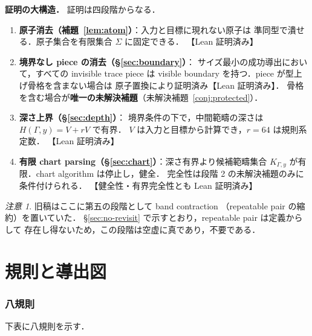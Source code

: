 \documentclass[paper=a4,fontsize=10pt,jafontscale=0.92]{jlreq}
\theoremstyle{plain}
\theoremstyle{definition}
\theoremstyle{remark}
\newtheorem*{remark}{注意}
\newcommand{\Sig}{\Sigma}
\begin{document}
\medskip
\noindent\textbf{証明の大構造．}
証明は四段階からなる．
\begin{enumerate}
  \item \textbf{原子消去（補題~\ref{lem:atom}）}：入力と目標に現れない原子は
    準同型で潰せる．原子集合を有限集合 $\Sig$ に固定できる．
    【Lean 証明済み】
  \item \textbf{境界なし piece の消去（\S\ref{sec:boundary}）}：
    サイズ最小の成功導出において，すべての invisible trace piece は
    visible boundary を持つ．piece が型上げ骨格を含まない場合は
    原子置換により証明済み【Lean 証明済み】．
    骨格を含む場合が\textbf{唯一の未解決補題}（未解決補題~\ref{conj:protected}）．
  \item \textbf{深さ上界（\S\ref{sec:depth}）}：
    境界条件の下で，中間範疇の深さは $H(\Gamma, y) = V + rV$ で有界．
    $V$ は入力と目標から計算でき，$r = 64$ は規則系定数．
    【Lean 証明済み】
  \item \textbf{有限 chart parsing（\S\ref{sec:chart}）}：深さ有界より候補範疇集合
    $K_{\Gamma,y}$ が有限．chart algorithm は停止し，健全．
    完全性は段階 2 の未解決補題のみに条件付けられる．
    【健全性・有界完全性とも Lean 証明済み】
\end{enumerate}

\begin{remark}
旧稿はここに第五の段階として band contraction
（repeatable pair の縮約）を置いていた．
\S\ref{sec:no-revisit} で示すとおり，repeatable pair は定義からして
存在し得ないため，この段階は空虚に真であり，不要である．
\end{remark}

\part{規則と導出図}

\section{八規則}

下表に八規則を示す．
\end{document}
